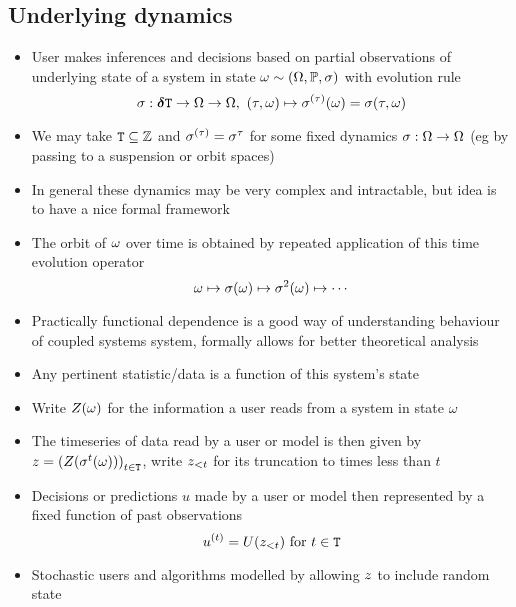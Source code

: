 \documentclass{article}
\begin{document}
\subsection{Underlying dynamics}
\begin{itemize}
  \item
    User makes inferences and decisions based on partial observations of underlying state of a system in state $\Und\sim(\UNI,\mathbb P,\sigma)$ with evolution rule
    $$
    \EV:\TIMEDELTAS\rightarrow\UNI\rightarrow\UNI,~(\TimeDelta,\Und)\mapsto\BTEV(\Und)=\EV(\TimeDelta,\Und)
    $$
  \item
    We may take $\TIMES\subseteq\SZ$ and $\BTEV=\EV^\TimeDelta$ for some fixed dynamics ${\sigma}:{\Omega}\rightarrow{\Omega}$ (eg by passing to a suspension or orbit spaces)
  \item
    In general these dynamics may be very complex and intractable, but idea is to have a nice formal framework
  \item
    The orbit of $\Und$ over time is obtained by repeated application of this time evolution operator
    $$
    \Und\mapsto\sigma(\Und)\mapsto\sigma^2(\Und)\mapsto\cdots
    $$
  \item
    Practically functional dependence is a good way of understanding behaviour of coupled systems system, formally allows for better theoretical analysis
  \item
    Any pertinent statistic/data is a function of this system's state
  \item
    Write $\OBS(\omega)$ for the information a user reads from a system in state $\omega$
  \item
    The timeseries of data read by a user or model is then given by $\Obs=\left(\OBS(\EV^t(\Und))\right)_{\Time\in\TIMES}$, write ${z}_{<t}$ for its truncation to times less than $t$
  \item
    Decisions or predictions $u$ made by a user or model then represented by a fixed function of past observations
    $$
    \TS[\Usr]=\USR(\Obs_{<\Time})\text{ for }\Time\in\TIMES
    $$
  \item
    Stochastic users and algorithms modelled by allowing ${z}$ to include random state
\end{itemize}
\end{document}
